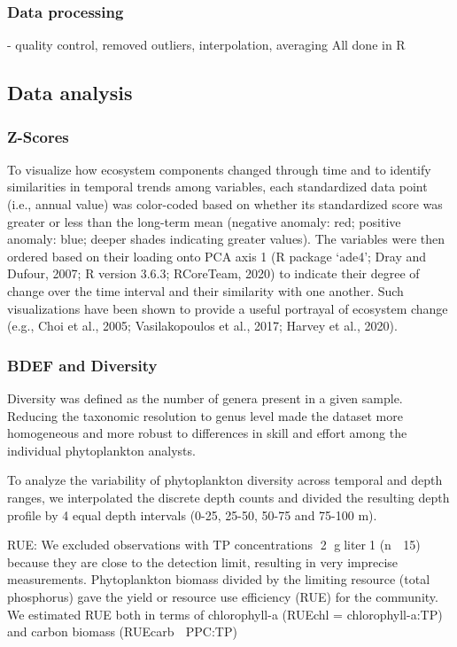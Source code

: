 \documentclass[draft]{agujournal2019}
\begin{document}
    \subsubsection{Data processing}
    - quality control, removed outliers, interpolation, averaging
    All done in R

    
    \subsection{Data analysis}
    
    \subsubsection{Z-Scores}
    To visualize how ecosystem components changed through time and to identify similarities in temporal trends among variables, each standardized data point (i.e., annual value) was color-coded based on whether its standardized score was greater or less than the long-term mean (negative anomaly: red; positive anomaly: blue; deeper shades indicating greater values). The variables were then ordered based on their loading onto PCA axis 1 (R package ‘ade4’; Dray and Dufour, 2007; R version 3.6.3; RCoreTeam, 2020) to indicate their degree of change over the time interval and their similarity with one another. Such visualizations have been shown to provide a useful portrayal of ecosystem change (e.g., Choi et al., 2005; Vasilakopoulos et al., 2017; Harvey et al., 2020).
    

    \subsubsection{BDEF and Diversity}
    Diversity was defined as the number of genera present in a given sample. Reducing the taxonomic resolution to genus level made the dataset more homogeneous and more robust to differences in skill and effort among the individual phytoplankton analysts. 


    To analyze the variability of phytoplankton diversity across temporal and depth ranges, we interpolated the discrete depth counts and divided the resulting depth profile by 4 equal depth intervals (0-25, 25-50, 50-75 and 75-100 m). 
    
    RUE: We excluded observations with TP concentrations 2 gliter1 (n  15) because they are close to the detection limit, resulting in very imprecise measurements.
    Phytoplankton biomass divided by the limiting resource (total phosphorus) gave the yield or resource use efficiency (RUE) for the community. We estimated RUE both in terms of chlorophyll-a (RUEchl = chlorophyll-a:TP) and carbon biomass (RUEcarb  PPC:TP)
\end{document}
